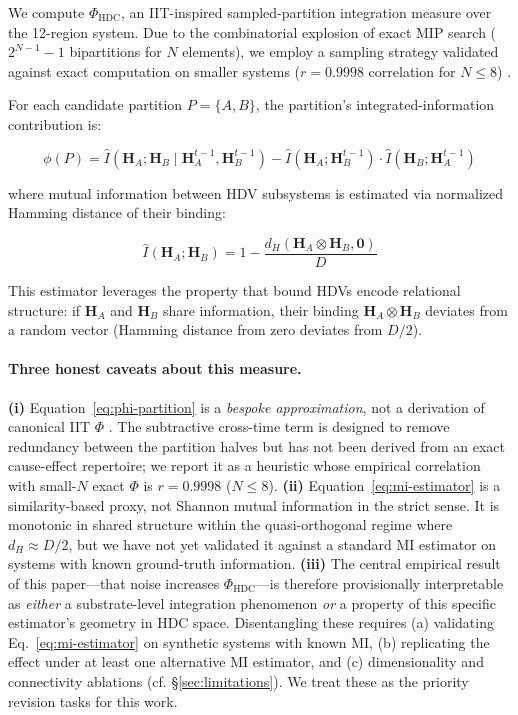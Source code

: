 \documentclass[12pt,a4paper]{article}
\begin{document}
We compute $\Phi_{\text{HDC}}$, an IIT-inspired sampled-partition integration measure over the 12-region system. Due to the combinatorial explosion of exact MIP search ($2^{N-1} - 1$ bipartitions for $N$ elements), we employ a sampling strategy validated against exact computation on smaller systems ($r = 0.9998$ correlation for $N \leq 8$) \citep{barrett2011practical}.

For each candidate partition $P = \{A, B\}$, the partition's integrated-information contribution is:

\begin{equation}
\phi(P) = \hat{I}(\mathbf{H}_A; \mathbf{H}_B \mid \mathbf{H}_A^{t-1}, \mathbf{H}_B^{t-1}) - \hat{I}(\mathbf{H}_A; \mathbf{H}_B^{t-1}) \cdot \hat{I}(\mathbf{H}_B; \mathbf{H}_A^{t-1})
\label{eq:phi-partition}
\end{equation}

where mutual information between HDV subsystems is estimated via normalized Hamming distance of their binding:

\begin{equation}
\hat{I}(\mathbf{H}_A; \mathbf{H}_B) = 1 - \frac{d_H(\mathbf{H}_A \otimes \mathbf{H}_B, \mathbf{0})}{D}
\label{eq:mi-estimator}
\end{equation}

This estimator leverages the property that bound HDVs encode relational structure: if $\mathbf{H}_A$ and $\mathbf{H}_B$ share information, their binding $\mathbf{H}_A \otimes \mathbf{H}_B$ deviates from a random vector (Hamming distance from zero deviates from $D/2$).

\paragraph{Three honest caveats about this measure.}
\textbf{(i)} Equation~\ref{eq:phi-partition} is a \emph{bespoke approximation}, not a derivation of canonical IIT $\Phi$ \citep{oizumi2014phenomenology}. The subtractive cross-time term is designed to remove redundancy between the partition halves but has not been derived from an exact cause-effect repertoire; we report it as a heuristic whose empirical correlation with small-$N$ exact $\Phi$ is $r = 0.9998$ ($N \leq 8$).
\textbf{(ii)} Equation~\ref{eq:mi-estimator} is a similarity-based proxy, not Shannon mutual information in the strict sense. It is monotonic in shared structure within the quasi-orthogonal regime where $d_H \approx D/2$, but we have not yet validated it against a standard MI estimator on systems with known ground-truth information.
\textbf{(iii)} The central empirical result of this paper---that noise increases $\Phi_{\text{HDC}}$---is therefore provisionally interpretable as \emph{either} a substrate-level integration phenomenon \emph{or} a property of this specific estimator's geometry in HDC space. Disentangling these requires (a) validating Eq.~\ref{eq:mi-estimator} on synthetic systems with known MI, (b) replicating the effect under at least one alternative MI estimator, and (c) dimensionality and connectivity ablations (cf. \S\ref{sec:limitations}). We treat these as the priority revision tasks for this work.
\end{document}
